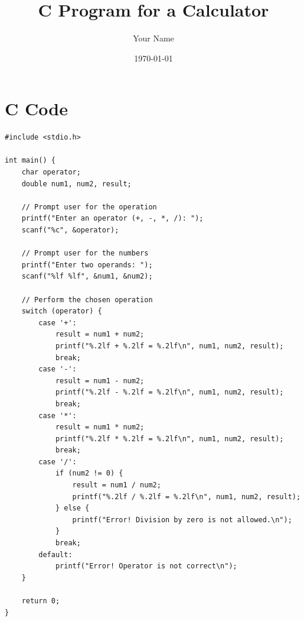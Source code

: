 \documentclass[12pt, a4paper]{article}
\begin{document}


\title{C Program for a Calculator}
\author{Your Name}
\date{\today}
\maketitle

\section{C Code}
\begin{lstlisting}
#include <stdio.h>

int main() {
    char operator;
    double num1, num2, result;

    // Prompt user for the operation
    printf("Enter an operator (+, -, *, /): ");
    scanf("%c", &operator);

    // Prompt user for the numbers
    printf("Enter two operands: ");
    scanf("%lf %lf", &num1, &num2);

    // Perform the chosen operation
    switch (operator) {
        case '+':
            result = num1 + num2;
            printf("%.2lf + %.2lf = %.2lf\n", num1, num2, result);
            break;
        case '-':
            result = num1 - num2;
            printf("%.2lf - %.2lf = %.2lf\n", num1, num2, result);
            break;
        case '*':
            result = num1 * num2;
            printf("%.2lf * %.2lf = %.2lf\n", num1, num2, result);
            break;
        case '/':
            if (num2 != 0) {
                result = num1 / num2;
                printf("%.2lf / %.2lf = %.2lf\n", num1, num2, result);
            } else {
                printf("Error! Division by zero is not allowed.\n");
            }
            break;
        default:
            printf("Error! Operator is not correct\n");
    }

    return 0;
}
\end{lstlisting}
\newpage

\end{document}
